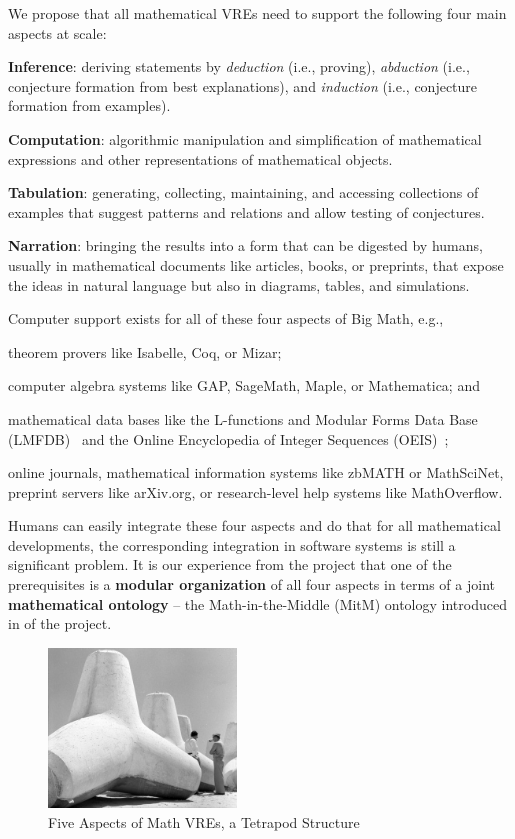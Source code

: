 We propose that all mathematical VREs need to support the following four main aspects at scale:
\begin{compactenum}[\em i\rm)]
\item \textbf{Inference}: deriving statements by \emph{deduction} (i.e.,
  proving), \emph{abduction} (i.e., conjecture formation from best
  explanations), and \emph{induction} (i.e., conjecture formation from examples).
\item \textbf{Computation}: algorithmic manipulation and simplification
  of mathematical expressions and other representations of
  mathematical objects.
\item \textbf{Tabulation}: generating, collecting, maintaining, and accessing
  collections of examples that suggest patterns and relations and allow testing
  of conjectures. 
\item \textbf{Narration}: bringing the results into a form that can be digested by humans,
  usually in mathematical documents like articles, books, or preprints, that expose the
  ideas in natural language but also in diagrams, tables, and simulations.
\end{compactenum} 
Computer support exists for all of these four aspects of Big Math, e.g.,
\begin{compactenum}[\em i\rm)]
\item theorem provers like Isabelle, Coq, or Mizar;
\item computer algebra systems like GAP, SageMath, Maple, or Mathematica; and
\item mathematical data bases like the L-functions and Modular Forms Data 
Base (LMFDB)~\cite{Cremona:LMFDB16,lmfdb:on} and the Online Encyclopedia of
Integer Sequences (OEIS)~\cite{Sloane:OEIS};
\item online journals, mathematical information systems like zbMATH or MathSciNet,
  preprint servers like arXiv.org, or research-level help systems like MathOverflow.
\end{compactenum}
Humans can easily integrate these four aspects and do that for all mathematical developments, the corresponding integration in software systems is still a significant problem. It is our experience from the \pn project that one of the prerequisites is a \textbf{modular organization} of all four aspects in terms of a joint \textbf{mathematical ontology} -- the Math-in-the-Middle (MitM) ontology introduced in  of the \pn project.

\begin{figure}[ht]\centering
\includegraphics[width=5cm]{tetrapod}\qquad

\caption{Five Aspects of Math VREs, a Tetrapod Structure}\label{fig:tetrapod}
\end{figure}

